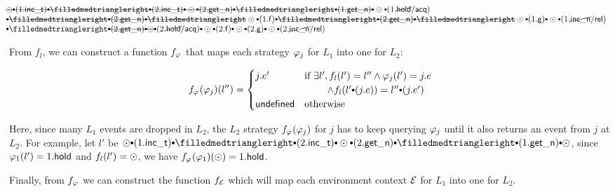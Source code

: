 \vspace*{-1ex}
\begin{small}
\[
\begin{array}{l}
\hspace*{-1em}\mysout
{\ssame \cons (1.\incticket) \cons
\sdiff \cons (2.\incticket) \cons
\ssame \cons (2.\getnow) \cons
\sdiff \cons (1.\getnow) \cons
}
\ssame \cons (1.\cancel{\holdlock}/\acq) 
\\
\hspace*{-1em}\mysout
{\cons 
\sdiff \cons (2.\getnow) \cons
\sdiff 
} 
\ssame \cons (1.\comm{f}) \cons
\mysout
{\sdiff \cons (2.\getnow) \cons
\sdiff
}
\ssame \cons (1.\comm{g}) \cons
\ssame \cons (1.\cancel{\incnow}/\rel) 
\\
\hspace*{-1em}\cons \sdiff 
\mysout
{\cons (2.\getnow) \cons
\ssame 
}
\cons (2.\cancel{\holdlock}/\acq) \cons
\ssame \cons (2.\comm{f}) \cons
\ssame \cons (2.\comm{g}) \cons
\ssame \cons (2.\cancel{\incnow}/\rel) 
\end{array}
\]
\end{small}

From $f_l$, we can construct a function $f_{\varphi_{}}$
that maps each strategy $\varphi_{j}$ for $L_1$ into one for $L_2$:

\vspace*{-1ex}
\begin{small}
\[ 
f_{\strat{}}(\strat{j}) (l'')=
\begin{cases}
j.e' & \text{if } 
\exists l', f_l(l') = l'' \wedge \strat{j}(l') = j.e\\
&\qquad\ \wedge f_l(l'\cons(j.e)) = l'' \cons (j.e') \\
\comm{undefined } & \text{otherwise}
\end{cases}
\]
\end{small}

Here, since many $L_1$ events are dropped in $L_2$,
the $L_2$ strategy $f_{\varphi_{}}(\varphi_{j})$ for $j$
has to keep querying $\varphi_{j}$ until
it also returns an event from $j$ at $L_2$.  For example, let $l'$ be
$\ssame \cons (1.\incticket) \cons \sdiff \cons (2.\incticket) \cons
\ssame \cons (2.\getnow) \cons \sdiff \cons (1.\getnow) \cons \ssame$,
since $\varphi_{1} (l') = 1.\mathsf{hold}$ and $f_l(l') = \odot$, we have
$f_{\varphi_{}}(\varphi_{1}) (\odot) =1.\mathsf{hold}$.

Finally, from $f_{\varphi_{}}$ we can construct the function
$f_{\mathcal{E}}$ which will map each environment context $\mathcal{E}$ for
$L_1$ into one for $L_2$.

